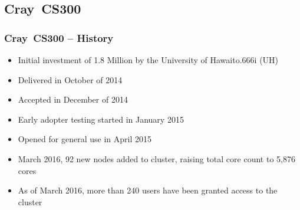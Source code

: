 \documentclass[t,hyperref={pdfpagelabels=false}]{beamer}
\newlength{\okinalen}
\newcommand{\okina}{\hbox to.666\okinalen{\hss`\hss}}
\newcommand{\hawaii}{Hawai{\okina}i}
\newcommand{\craycs}{Cray~CS300}
\begin{document}
\subsection{{\craycs}}
\begin{frame}
\frametitle{{\craycs} -- History}
\begin{itemize}
 \item Initial investment of 1.8 Million by the University of {\hawaii} (UH)
 \item Delivered in October of 2014
 \item Accepted in December of 2014 
 \item Early adopter testing started in January 2015
 \item Opened for general use in April 2015
 \item March 2016, 92 new nodes added to cluster, raising total core count to 5,876 cores
 \item As of March 2016, more than 240 users have been granted access to the cluster
\end{itemize}
\end{frame}
\end{document}

